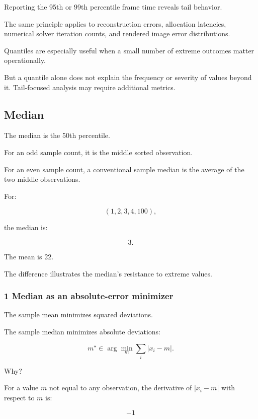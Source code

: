 Reporting the 95th or 99th percentile frame time reveals tail behavior.

The same principle applies to reconstruction errors, allocation latencies, numerical solver iteration counts, and rendered image error distributions.

Quantiles are especially useful when a small number of extreme outcomes matter operationally.

But a quantile alone does not explain the frequency or severity of values beyond it. Tail-focused analysis may require additional metrics.

\subsection{Median}\label{02-foundations-ii-ch030-median}

\hypertarget{02-foundations-ii-ch030-median}{}

The median is the 50th percentile.

For an odd sample count, it is the middle sorted observation.

For an even sample count, a conventional sample median is the average of the two middle observations.

For:

\[
 (1,2,3,4,100),
\]

the median is:

\[
 \boxed{3}.
\]

The mean is 22.

The difference illustrates the median's resistance to extreme values.

\subsubsection{1 Median as an absolute-error minimizer}\label{02-foundations-ii-ch030-median-as-an-absolute-error-minimizer}

\hypertarget{02-foundations-ii-ch030-median-as-an-absolute-error-minimizer}{}

The sample mean minimizes squared deviations.

The sample median minimizes absolute deviations:

\[
 \boxed{ m^\star\in \arg\min_m\sum_i|x_i-m| }.
\]

Why?

For a value \(m\) not equal to any observation, the derivative of \(|x_i-m|\) with respect to \(m\) is:

\[
 -1
\]

